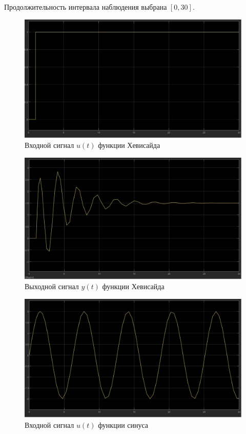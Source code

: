 \documentclass[a4paper, 12pt]{article}
\begin{document}
    Продолжительность интервала наблюдения выбрана $[0,30]$.
    \begin{figure}[H]
        \centering
        \includegraphics[scale=0.3]{1_t_u.jpg}
        \captionsetup{skip=0pt}
        \caption{Входной сигнал $u(t)$ функции Хевисайда}
        \label{fig:1tu}
    \end{figure}
    \begin{figure}[H]
        \centering
        \includegraphics[scale=0.3]{1_t_y.jpg}
        \captionsetup{skip=0pt}
        \caption{Выходной сигнал $y(t)$ функции Хевисайда}
        \label{fig:1ty}
    \end{figure}
    \begin{figure}[H]
        \centering
        \includegraphics[scale=0.3]{sin_u.jpg}
        \captionsetup{skip=0pt}
        \caption{Входной сигнал $u(t)$ функции синуса}
        \label{fig:sinu}
    \end{figure}
\end{document}

